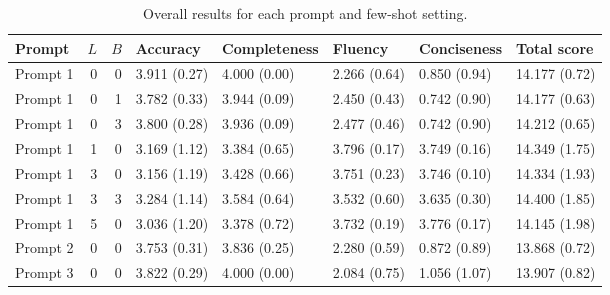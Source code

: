 \begin{table}
\caption{Overall results for each prompt and few-shot setting.}
\begin{tabular}{lrrlllll}
\toprule
Prompt & $L$ & $B$ & Accuracy & Completeness & Fluency & Conciseness & Total score \\
\midrule
Prompt 1 & 0 & 0 & 3.911 (0.27) & 4.000 (0.00) & 2.266 (0.64) & 0.850 (0.94) & 14.177 (0.72) \\
Prompt 1 & 0 & 1 & 3.782 (0.33) & 3.944 (0.09) & 2.450 (0.43) & 0.742 (0.90) & 14.177 (0.63) \\
Prompt 1 & 0 & 3 & 3.800 (0.28) & 3.936 (0.09) & 2.477 (0.46) & 0.742 (0.90) & 14.212 (0.65) \\
Prompt 1 & 1 & 0 & 3.169 (1.12) & 3.384 (0.65) & 3.796 (0.17) & 3.749 (0.16) & 14.349 (1.75) \\
Prompt 1 & 3 & 0 & 3.156 (1.19) & 3.428 (0.66) & 3.751 (0.23) & 3.746 (0.10) & 14.334 (1.93) \\
Prompt 1 & 3 & 3 & 3.284 (1.14) & 3.584 (0.64) & 3.532 (0.60) & 3.635 (0.30) & 14.400 (1.85) \\
Prompt 1 & 5 & 0 & 3.036 (1.20) & 3.378 (0.72) & 3.732 (0.19) & 3.776 (0.17) & 14.145 (1.98) \\
Prompt 2 & 0 & 0 & 3.753 (0.31) & 3.836 (0.25) & 2.280 (0.59) & 0.872 (0.89) & 13.868 (0.72) \\
Prompt 3 & 0 & 0 & 3.822 (0.29) & 4.000 (0.00) & 2.084 (0.75) & 1.056 (1.07) & 13.907 (0.82) \\
\bottomrule
\end{tabular}
\end{table}
